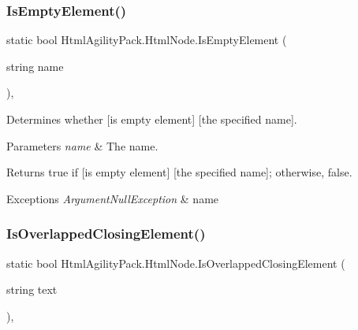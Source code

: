 \subsubsection{\texorpdfstring{Is\+Empty\+Element()}{IsEmptyElement()}}
{\footnotesize\ttfamily static bool Html\+Agility\+Pack.\+Html\+Node.\+Is\+Empty\+Element (\begin{DoxyParamCaption}\item[{string}]{name }\end{DoxyParamCaption})\hspace{0.3cm}{\ttfamily [inline]}, {\ttfamily [static]}}



Determines whether \mbox{[}is empty element\mbox{]} \mbox{[}the specified name\mbox{]}. 


\begin{DoxyParams}{Parameters}
{\em name} & The name.\\
\hline
\end{DoxyParams}
\begin{DoxyReturn}{Returns}
{\ttfamily true} if \mbox{[}is empty element\mbox{]} \mbox{[}the specified name\mbox{]}; otherwise, {\ttfamily false}.
\end{DoxyReturn}

\begin{DoxyExceptions}{Exceptions}
{\em Argument\+Null\+Exception} & name\\
\hline
\end{DoxyExceptions}
\mbox{\label{class_html_agility_pack_1_1_html_node_ab5eb05dddf6f617bbfd64e9ab8b8d8c7}} 
\subsubsection{\texorpdfstring{Is\+Overlapped\+Closing\+Element()}{IsOverlappedClosingElement()}}
{\footnotesize\ttfamily static bool Html\+Agility\+Pack.\+Html\+Node.\+Is\+Overlapped\+Closing\+Element (\begin{DoxyParamCaption}\item[{string}]{text }\end{DoxyParamCaption})\hspace{0.3cm}{\ttfamily [inline]}, {\ttfamily [static]}}



